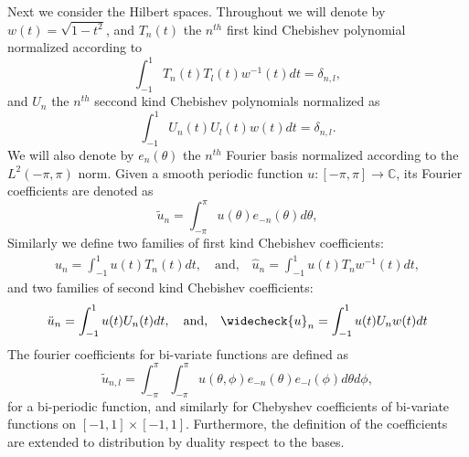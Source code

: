 \documentclass{article}
\newcommand{\IC}{{\mathbb C}}
\begin{document}
Next we consider the Hilbert spaces. Throughout we will denote by $w(t) = \sqrt{1-t^2}$, and $T_n(t)$ the $n^{th}$ first kind Chebishev polynomial normalized according to $$\int_{-1}^1 T_n(t) T_l(t) w^{-1}(t) dt = \delta_{n,l},$$ and $U_n$ the $n^{th}$ seccond kind Chebishev polynomials normalized as 
$$\int_{-1}^1 U_n(t) U_l(t) w(t) dt = \delta_{n,l}.$$
 We will also denote by $e_n(\theta)$ the $n^{th}$ Fourier basis normalized according to the $L^2(-\pi,\pi)$ norm. 
Given a smooth periodic function $u :[-\pi,\pi] \rightarrow \IC$, its Fourier coefficients are denoted as
$$
\widetilde{u}_n = \int_{-\pi}^\pi u(\theta) e_{-n}(\theta) d\theta, 
$$
Similarly we define two families of first kind Chebishev coefficients:
\begin{align*}
u_n = \int_{-1}^{1} u(t) T_n(t) dt, \quad \text{and,} \quad  \widehat{u}_n = \int_{-1}^1 u(t) T_n w^{-1}(t)dt, 
\end{align*}
and two families of second kind Chebishev coefficients:
\begin{align*}
\ddot{u}_n = \int_{-1}^1 u(t) U_n (t) dt,\quad \text{and,}\quad \widecheck{u} _n = \int_{-1}^1 u(t) U_n w(t) dt
\end{align*}
The fourier coefficients for bi-variate functions are defined as
$$\widetilde{u}_{n,l} = \int_{-\pi}^{\pi}\int_{-\pi}^\pi u(\theta,\phi) e_{-n}(\theta)e_{-l}(\phi) d\theta d\phi,$$
for a bi-periodic function, and similarly  for Chebyshev coefficients of  bi-variate functions on $[-1,1]\times[-1,1]$. Furthermore, the definition of the coefficients are extended to distribution by duality respect to the bases. 
\end{document}
